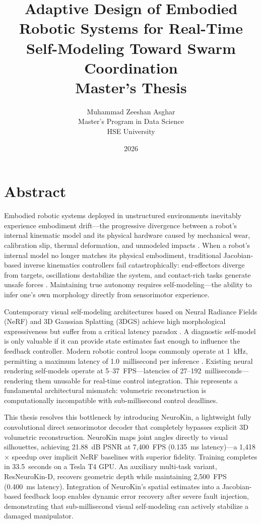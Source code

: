 \documentclass[12pt,a4paper,oneside]{report}
\title{
    \vspace{2cm}
    \textbf{\Large Adaptive Design of Embodied Robotic Systems for Real-Time Self-Modeling Toward Swarm Coordination} \\
    \vspace{1cm}
    \large Master's Thesis
}
\author{
    Muhammad Zeeshan Asghar \\
    Master's Program in Data Science \\
    HSE University
}
\date{\vspace{1cm} 2026}
\begin{document}
\maketitle
\clearpage

\chapter*{Abstract}

Embodied robotic systems deployed in unstructured environments inevitably experience embodiment drift---the progressive divergence between a robot's internal kinematic model and its physical hardware caused by mechanical wear, calibration slip, thermal deformation, and unmodeled impacts \cite{bongard2006resilient, cully2015robots}. When a robot's internal model no longer matches its physical embodiment, traditional Jacobian-based inverse kinematics controllers fail catastrophically: end-effectors diverge from targets, oscillations destabilize the system, and contact-rich tasks generate unsafe forces \cite{kwiatkowski2019task, chen2022full}. Maintaining true autonomy requires self-modeling---the ability to infer one's own morphology directly from sensorimotor experience.

Contemporary visual self-modeling architectures based on Neural Radiance Fields (NeRF) and 3D Gaussian Splatting (3DGS) achieve high morphological expressiveness but suffer from a critical latency paradox \cite{hu2024teaching, hu2025learning}. A diagnostic self-model is only valuable if it can provide state estimates fast enough to influence the feedback controller. Modern robotic control loops commonly operate at 1~kHz, permitting a maximum latency of 1.0~millisecond per inference \cite{siciliano2009robotics}. Existing neural rendering self-models operate at 5--37~FPS---latencies of 27--192~milliseconds---rendering them unusable for real-time control integration. This represents a fundamental architectural mismatch: volumetric reconstruction is computationally incompatible with sub-millisecond control deadlines.

This thesis resolves this bottleneck by introducing NeuroKin, a lightweight fully convolutional direct sensorimotor decoder that completely bypasses explicit 3D volumetric reconstruction. NeuroKin maps joint angles directly to visual silhouettes, achieving 21.88~dB PSNR at 7,400~FPS (0.135~ms latency)---a 1,418$\times$ speedup over implicit NeRF baselines with superior fidelity. Training completes in 33.5~seconds on a Tesla T4 GPU. An auxiliary multi-task variant, ResNeuroKin-D, recovers geometric depth while maintaining 2,500~FPS (0.400~ms latency). Integration of NeuroKin's spatial estimates into a Jacobian-based feedback loop enables dynamic error recovery after severe fault injection, demonstrating that sub-millisecond visual self-modeling can actively stabilize a damaged manipulator.
\end{document}
